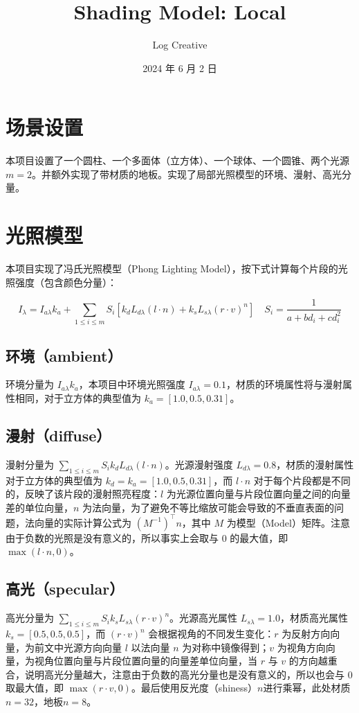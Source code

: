 \documentclass[math-font=newcm]{sjtuarticle}
\title{Shading Model: Local}
\author{Log Creative}
\date{2024 年 6 月 2 日}
\begin{document}
\maketitle

\tableofcontents*
\clearpage

\section{场景设置}

本项目设置了一个圆柱、一个多面体（立方体）、一个球体、一个圆锥、两个光源$m=2$。并额外实现了带材质的地板。实现了局部光照模型的环境、漫射、高光分量。

\section{光照模型}

本项目实现了冯氏光照模型（Phong Lighting Model），按下式计算每个片段的光照强度（包含颜色分量）：

\begin{equation}\label{eq:phong}
    I_\lambda=I_{a\lambda}k_a+\sum_{1\leq i\leq m}S_i[k_dL_{d\lambda}(l\cdot n)+k_sL_{s\lambda}(r\cdot v)^n]\quad S_i=\frac{1}{a+bd_i+cd_i^2}
\end{equation}

\subsection{环境（ambient）}

环境分量为 $I_{a\lambda}k_a$，本项目中环境光照强度 $I_{a\lambda}=0.1$，材质的环境属性将与漫射属性相同，对于立方体的典型值为 $k_a=[1.0, 0.5, 0.31]$。

\subsection{漫射（diffuse）}
漫射分量为 $\sum_{1\leq i\leq m}S_ik_dL_{d\lambda}(l\cdot n)$。光源漫射强度 $L_{d\lambda}=0.8$，材质的漫射属性对于立方体的典型值为 $k_d=k_a=[1.0, 0.5, 0.31]$，而 $l\cdot n$ 对于每个片段都是不同的，反映了该片段的漫射照亮程度：$l$ 为光源位置向量与片段位置向量之间的向量差的单位向量，$n$ 为法向量，为了避免不等比缩放可能会导致的不垂直表面的问题\cite{normal}，法向量的实际计算公式为 $(M^{-1})^\top n$，其中 $M$ 为模型（Model）矩阵。注意由于负数的光照是没有意义的，所以事实上会取与 0 的最大值，即 $\max(l\cdot n, 0)$。

\subsection{高光（specular）}
高光分量为 $\sum_{1\leq i\leq m}S_ik_sL_{s\lambda}(r\cdot v)^n$。光源高光属性 $L_{s\lambda}=1.0$，材质高光属性 $k_s=[0.5,0.5,0.5]$，而 $(r\cdot v)^n$ 会根据视角的不同发生变化：$r$ 为反射方向向量，为前文中光源方向向量 $l$ 以法向量 $n$ 为对称中镜像得到；$v$ 为视角方向向量，为视角位置向量与片段位置向量的向量差单位向量，当 $r$ 与 $v$ 的方向越重合，说明高光分量越大，注意由于负数的高光分量也是没有意义的，所以也会与 0 取最大值，即 $\max(r\cdot v,0)$。最后使用反光度（shiness）$n$进行乘幂，此处材质 $n=32$，地板$n=8$。
\end{document}
